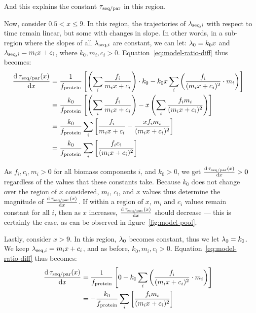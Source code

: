 And this explains the constant $\tau_{\mathrm{seq}/\mathrm{par}}$ in this region.

Now, consider $0.5 < x \leq 9$.
In this region, the trajectories of $\lambda_{\mathrm{seq},i}$ with respect to time remain linear, but some with changes in slope.
In other words, in a sub-region where the slopes of all $\lambda_{\mathrm{seq},i}$ are constant, we can let: $\lambda_{0} = k_{0}x$ and $\lambda_{\mathrm{seq},i} = m_{i}x + c_{i}$, where $k_{0}, m_{i}, c_{i} > 0$.
Equation~\ref{eq:model-ratio-diff} thus becomes:
\begin{equation}
  \begin{aligned}
  \frac{\mathrm{d} \, \tau_{\mathrm{seq}/\mathrm{par}}(x)}{\mathrm{d} x} &= \frac{1}{f_{\mathrm{protein}}} \left[ \left( \sum_i \frac{f_i}{m_{i}x+c_{i}} \right) \cdot k_{0} - k_{0}x \sum_{i}\left( \frac{f_{i}}{(m_{i}x+c_{i})^{2}} \cdot m_{i} \right) \right]\\
  &= \frac{k_{0}}{f_{\mathrm{protein}}} \left[ \left( \sum_i \frac{f_i}{m_{i}x+c_{i}} \right) - x \left( \sum_{i} \frac{f_{i}m_{i}}{(m_{i}x+c_{i})^{2}} \right) \right]\\
  &= \frac{k_{0}}{f_{\mathrm{protein}}} \sum_{i} \left[ \frac{f_i}{m_{i}x+c_{i}} - \frac{xf_{i}m_{i}}{(m_{i}x+c_{i})^{2}} \right]\\
  &= \frac{k_{0}}{f_{\mathrm{protein}}} \sum_{i} \left[ \frac{f_{i}c_{i}}{(m_{i}x+c_{i})^{2}} \right]
  \end{aligned}
  \label{eq:model-ratio-diff-midx}
\end{equation}

As $f_{i}, c_{i}, m_{i} > 0$ for all biomass components $i$, and $k_{0} > 0$, we get $\frac{\mathrm{d} \, \tau_{\mathrm{seq}/\mathrm{par}}(x)}{\mathrm{d} x} > 0$ regardless of the values that these constants take.
Because $k_{0}$ does not change over the region of $x$ considered, $m_{i}$, $c_{i}$, and $x$ values thus determine the magnitude of $\frac{\mathrm{d} \, \tau_{\mathrm{seq}/\mathrm{par}}(x)}{\mathrm{d} x}$.
If within a region of $x$, $m_{i}$ and $c_{i}$ values remain constant for all $i$, then as $x$ increases, $\frac{\mathrm{d} \, \tau_{\mathrm{seq}/\mathrm{par}}(x)}{\mathrm{d} x}$ should decrease --- this is certainly the case, as can be observed in figure~\ref{fig:model-pool}.

Lastly, consider $x > 9$.
In this region, $\lambda_{0}$ becomes constant, thus we let $\lambda_{0} = k_{0}$.
We keep $\lambda_{\mathrm{seq},i} = m_{i}x + c_{i}$, and as before, $k_{0}, m_{i}, c_{i} > 0$.
Equation~\ref{eq:model-ratio-diff} thus becomes:
\begin{equation}
  \begin{aligned}
  \frac{\mathrm{d} \, \tau_{\mathrm{seq}/\mathrm{par}}(x)}{\mathrm{d} x} &= \frac{1}{f_{\mathrm{protein}}} \left[ 0 - k_{0} \sum_{i}\left( \frac{f_{i}}{(m_{i}x+c_{i})^{2}} \cdot m_{i} \right) \right]\\
  &= -\frac{k_{0}}{f_{\mathrm{protein}}} \sum_{i}\left[ \frac{f_{i}m_{i}}{(m_{i}x+c_{i})^{2}} \right]
  \end{aligned}
  \label{eq:model-ratio-diff-largex}
\end{equation}

